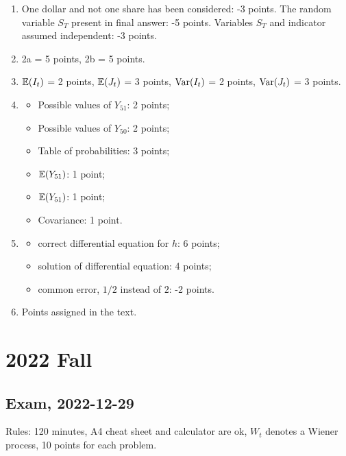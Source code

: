 \documentclass[12pt, a4paper]{article}
\begin{document}
\begin{enumerate}
  \item One dollar and not one share has been considered: -3 points. 
  The random variable $S_T$ present in final answer: -5 points. 
  Variables $S_T$ and indicator assumed independent: -3 points. 

  \item 2a = 5 points, 2b = 5 points.

  \item $\operatorname{\mathbb{E}}(I_t)$ = 2 points, $\operatorname{\mathbb{E}}(J_t)$ = 3 points,  $\operatorname{Var}(I_t)$ = 2 points, $\operatorname{Var}(J_t)$ = 3 points.
  
  \item 
  \begin{itemize}
    \item Possible values of $Y_{51}$: 2 points;
  \item Possible values of $Y_{50}$: 2 points; 
  \item Table of probabilities: 3 points; 
  \item $\operatorname{\mathbb{E}}(Y_{51})$: 1 point; 
  \item $\operatorname{\mathbb{E}}(Y_{51})$: 1 point; 
  \item Covariance: 1 point.
  \end{itemize}
  
  
  \item 
  \begin{itemize}
    \item correct differential equation for $h$: 6 points;
    \item solution of differential equation: 4 points;
    \item common error, $1/2$ instead of $2$: -2 points. 
  \end{itemize}
  
  \item Points assigned in the text. 
  
\end{enumerate}

\section{2022 Fall}

\subsection{Exam, 2022-12-29}

Rules: 120 minutes, A4 cheat sheet and calculator are ok, $W_t$ denotes a Wiener process,
10 points for each problem.
\end{document}
